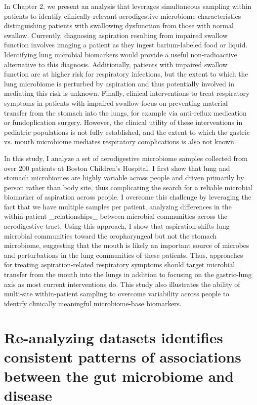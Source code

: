 In Chapter 2, we present an analysis that leverages simultaneous sampling within patients to identify clinically-relevant aerodigestive microbiome characteristics distinguishing patients with swallowing dysfunction from those with normal swallow.
Currently, diagnosing aspiration resulting from impaired swallow function involves imaging a patient as they ingest barium-labeled food or liquid.
Identifying lung microbial biomarkers would provide a useful non-radioactive alternative to this diagnosis.
Additionally, patients with impaired swallow function are at higher risk for respiratory infections, but the extent to which the lung microbiome is perturbed by aspiration and thus potentially involved in mediating this risk is unknown.
Finally, clinical interventions to treat respiratory symptoms in patients with impaired swallow focus on preventing material transfer from the stomach into the lungs, for example via anti-reflux medication or fundoplication surgery.
However, the clinical utility of these interventions in pediatric populations is not fully established, and the extent to which the gastric vs. mouth microbiome mediates respiratory complications is also not known.

In this study, I analyze a set of aerodigestive microbiome samples collected from over 200 patients at Boston Children's Hospital.
I first show that lung and stomach microbiomes are highly variable across people and driven primarily by person rather than body site, thus complicating the search for a reliable microbial biomarker of aspiration across people.
I overcome this challenge by leveraging the fact that we have multiple samples per patient, analyzing differences in the within-patient _relationships_ between microbial communities across the aerodigestive tract.
Using this approach, I show that aspiration shifts lung microbial communities toward the oropharyngeal but not the stomach microbiome, suggesting that the mouth is likely an important source of microbes and perturbations in the lung communities of these patients.
Thus, approaches for treating aspiration-related respiratory symptoms should target microbial transfer from the mouth into the lungs in addition to focusing on the gastric-lung axis as most current interventions do.
This study also illustrates the ability of multi-site within-patient sampling to overcome variability across people to identify clinically meaningful microbiome-base biomarkers.

\section{Re-analyzing datasets identifies consistent patterns of associations between the gut microbiome and disease}


